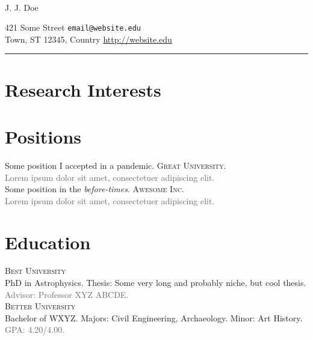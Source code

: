 \documentclass[12pt]{article}
\newcommand{\smallitem}[1]{\small\textcolor{dimgray}{#1}}
\begin{document}
\begin{fullpagesection}
\begin{flushleft}
\hfill{\updateinfo} \\

{\centering \huge J. J. Doe\par}

421 Some Street \hfill \texttt{email@website.edu} \\

Town, ST 12345, Country \hfill \url{http://website.edu}
\end{flushleft}
\centering\rule{7.4in}{1pt}\par
\end{fullpagesection}


\section{Research Interests}
\begin{fullpagesection}
\lipsum[75]
\end{fullpagesection}

\section{Positions}
 Some position I accepted in a pandemic. \textsc{Great University}.\\
\smallitem{Lorem ipsum dolor sit amet, consectetuer adipiscing elit.}\\

 Some position in the \textit{before-times}. \textsc{Awesome Inc.}\\
\smallitem{Lorem ipsum dolor sit amet, consectetuer adipiscing elit.}

\section{Education}
\textsc{Best University}\\ 
PhD in Astrophysics. Thesis: Some very long and probably niche, but cool thesis.\\
\smallitem{Advisor: Professor XYZ ABCDE.}\\

\textsc{Better University}\\
Bachelor of WXYZ. Majors: Civil Engineering, Archaeology. Minor: Art History.\\
\smallitem{GPA: 4.20/4.00.}
\end{document}
